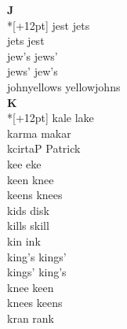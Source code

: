\vspace{14pt}
\noindent\textbf{\Large J}\\*[+12pt]
jest jets\\
jets jest\\
jew's jews'\\
jews' jew's\\
johnyellows yellowjohns\\

\vspace{14pt}
\noindent\textbf{\Large K}\\*[+12pt]
kale lake\\
karma makar\\
kcirtaP Patrick\\
kee eke\\
keen knee\\
keens knees\\
kids disk\\
kills skill\\
kin ink\\
king's kings'\\
kings' king's\\
knee keen\\
knees keens\\
kran rank\\

